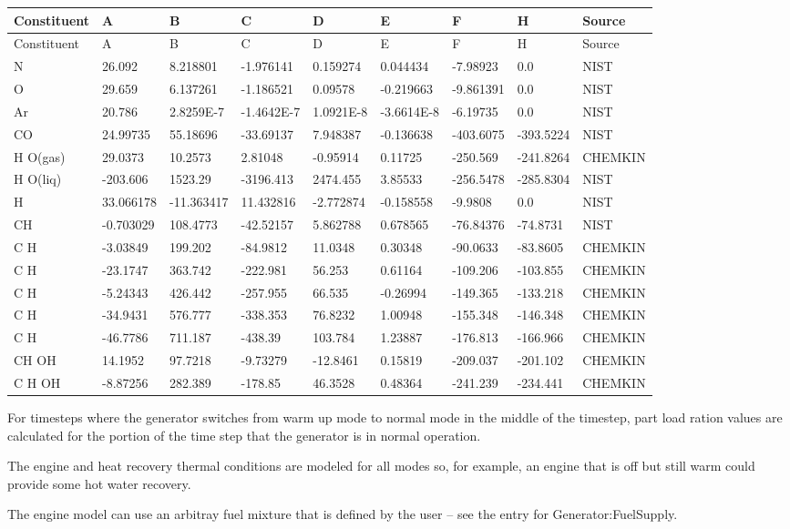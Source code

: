 \begin{longtable}[c]{p{0.66in}p{0.66in}p{0.66in}p{0.66in}p{0.66in}p{0.66in}p{0.66in}p{0.66in}p{0.66in}}
\toprule 
Constituent & A & B & C & D & E & F & H & Source \tabularnewline
\midrule
\endfirsthead

\toprule 
Constituent & A & B & C & D & E & F & H & Source \tabularnewline
\midrule
\endhead

N & 26.092 & 8.218801 & -1.976141 & 0.159274 & 0.044434 & -7.98923 & 0.0 & NIST \tabularnewline
O & 29.659 & 6.137261 & -1.186521 & 0.09578 & -0.219663 & -9.861391 & 0.0 & NIST \tabularnewline
Ar & 20.786 & 2.8259E-7 & -1.4642E-7 & 1.0921E-8 & -3.6614E-8 & -6.19735 & 0.0 & NIST \tabularnewline
CO & 24.99735 & 55.18696 & -33.69137 & 7.948387 & -0.136638 & -403.6075 & -393.5224 & NIST \tabularnewline
H  O(gas) & 29.0373 & 10.2573 & 2.81048 & -0.95914 & 0.11725 & -250.569 & -241.8264 & CHEMKIN \tabularnewline
H  O(liq) & -203.606 & 1523.29 & -3196.413 & 2474.455 & 3.85533 & -256.5478 & -285.8304 & NIST \tabularnewline
H & 33.066178 & -11.363417 & 11.432816 & -2.772874 & -0.158558 & -9.9808 & 0.0 & NIST \tabularnewline
CH & -0.703029 & 108.4773 & -42.52157 & 5.862788 & 0.678565 & -76.84376 & -74.8731 & NIST \tabularnewline
C  H & -3.03849 & 199.202 & -84.9812 & 11.0348 & 0.30348 & -90.0633 & -83.8605 & CHEMKIN \tabularnewline
C  H & -23.1747 & 363.742 & -222.981 & 56.253 & 0.61164 & -109.206 & -103.855 & CHEMKIN \tabularnewline
C  H & -5.24343 & 426.442 & -257.955 & 66.535 & -0.26994 & -149.365 & -133.218 & CHEMKIN \tabularnewline
C  H & -34.9431 & 576.777 & -338.353 & 76.8232 & 1.00948 & -155.348 & -146.348 & CHEMKIN \tabularnewline
C  H & -46.7786 & 711.187 & -438.39 & 103.784 & 1.23887 & -176.813 & -166.966 & CHEMKIN \tabularnewline
CH  OH & 14.1952 & 97.7218 & -9.73279 & -12.8461 & 0.15819 & -209.037 & -201.102 & CHEMKIN \tabularnewline
C  H  OH & -8.87256 & 282.389 & -178.85 & 46.3528 & 0.48364 & -241.239 & -234.441 & CHEMKIN \tabularnewline
\bottomrule
\end{longtable}

For timesteps where the generator switches from warm up mode to normal mode in the middle of the timestep, part load ration values are calculated for the portion of the time step that the generator is in normal operation.

The engine and heat recovery thermal conditions are modeled for all modes so, for example, an engine that is off but still warm could provide some hot water recovery.

The engine model can use an arbitray fuel mixture that is defined by the user -- see the entry for Generator:FuelSupply.

